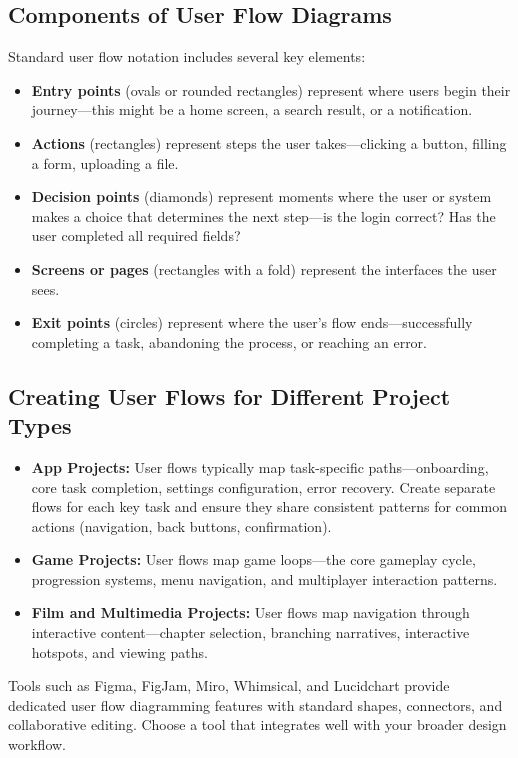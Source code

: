 \documentclass[12pt,a4paper]{article}
\begin{document}
\subsection*{Components of User Flow Diagrams}
Standard user flow notation includes several key elements:
\begin{itemize}
    \item \textbf{Entry points} (ovals or rounded rectangles) represent where users begin their journey—this might be a home screen, a search result, or a notification.
    \item \textbf{Actions} (rectangles) represent steps the user takes—clicking a button, filling a form, uploading a file.
    \item \textbf{Decision points} (diamonds) represent moments where the user or system makes a choice that determines the next step—is the login correct? Has the user completed all required fields?
    \item \textbf{Screens or pages} (rectangles with a fold) represent the interfaces the user sees.
    \item \textbf{Exit points} (circles) represent where the user’s flow ends—successfully completing a task, abandoning the process, or reaching an error.
\end{itemize}

\subsection*{Creating User Flows for Different Project Types}
\begin{itemize}
    \item \textbf{App Projects:} User flows typically map task-specific paths—onboarding, core task completion, settings configuration, error recovery. Create separate flows for each key task and ensure they share consistent patterns for common actions (navigation, back buttons, confirmation).
    \item \textbf{Game Projects:} User flows map game loops—the core gameplay cycle, progression systems, menu navigation, and multiplayer interaction patterns.
    \item \textbf{Film and Multimedia Projects:} User flows map navigation through interactive content—chapter selection, branching narratives, interactive hotspots, and viewing paths.
\end{itemize}

Tools such as Figma, FigJam, Miro, Whimsical, and Lucidchart provide dedicated user flow diagramming features with standard shapes, connectors, and collaborative editing. Choose a tool that integrates well with your broader design workflow.
\end{document}
